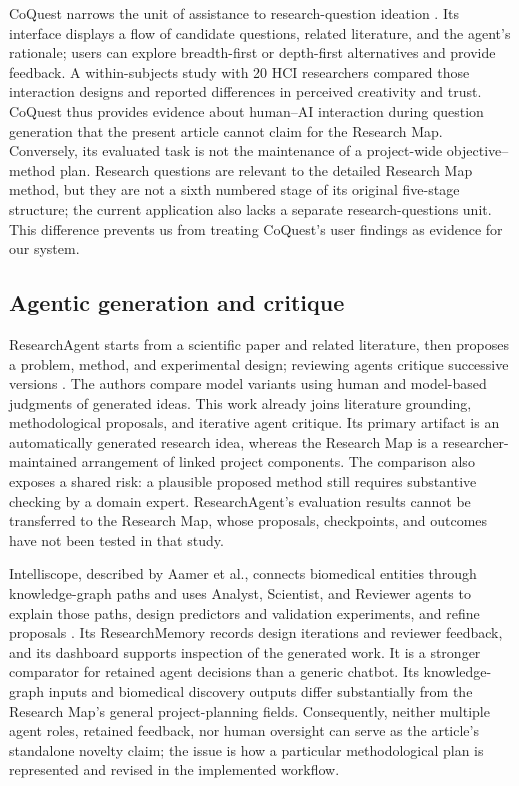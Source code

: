 CoQuest narrows the unit of assistance to research-question ideation \cite{liu2024coquest}. Its interface displays a flow of candidate questions, related literature, and the agent's rationale; users can explore breadth-first or depth-first alternatives and provide feedback. A within-subjects study with 20 HCI researchers compared those interaction designs and reported differences in perceived creativity and trust. CoQuest thus provides evidence about human--AI interaction during question generation that the present article cannot claim for the Research Map. Conversely, its evaluated task is not the maintenance of a project-wide objective--method plan. Research questions are relevant to the detailed Research Map method, but they are not a sixth numbered stage of its original five-stage structure; the current application also lacks a separate research-questions unit. This difference prevents us from treating CoQuest's user findings as evidence for our system.

\subsection{Agentic generation and critique}

ResearchAgent starts from a scientific paper and related literature, then proposes a problem, method, and experimental design; reviewing agents critique successive versions \cite{baek2025researchagent}. The authors compare model variants using human and model-based judgments of generated ideas. This work already joins literature grounding, methodological proposals, and iterative agent critique. Its primary artifact is an automatically generated research idea, whereas the Research Map is a researcher-maintained arrangement of linked project components. The comparison also exposes a shared risk: a plausible proposed method still requires substantive checking by a domain expert. ResearchAgent's evaluation results cannot be transferred to the Research Map, whose proposals, checkpoints, and outcomes have not been tested in that study.

Intelliscope, described by Aamer et al., connects biomedical entities through knowledge-graph paths and uses Analyst, Scientist, and Reviewer agents to explain those paths, design predictors and validation experiments, and refine proposals \cite{aamer2026biomedical}. Its ResearchMemory records design iterations and reviewer feedback, and its dashboard supports inspection of the generated work. It is a stronger comparator for retained agent decisions than a generic chatbot. Its knowledge-graph inputs and biomedical discovery outputs differ substantially from the Research Map's general project-planning fields. Consequently, neither multiple agent roles, retained feedback, nor human oversight can serve as the article's standalone novelty claim; the issue is how a particular methodological plan is represented and revised in the implemented workflow.

